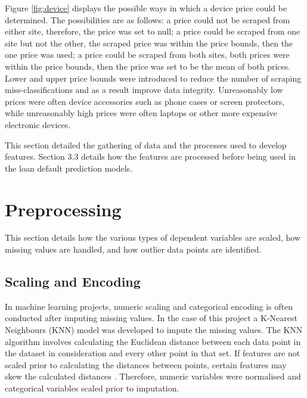 \vspace{10pt}

Figure \ref{fig:device} displays the possible ways in which a device price could be determined. The possibilities are as follows: a price could not be scraped from either site, therefore, the price was set to null; a price could be scraped from one site but not the other, the scraped price was within the price bounds, then the one price was used; a price could be scraped from both sites, both prices were within the price bounds, then the price was set to be the mean of both prices. Lower and upper price bounds were introduced to reduce the number of scraping miss-classifications and as a result improve data integrity. Unreasonably low prices were often device accessories such as phone cases or screen protectors, while unreasonably high prices were often laptops or other more expensive electronic devices.

This section detailed the gathering of data and the processes used to develop features. Section 3.3 details how the features are processed before being used in the loan default prediction models. 


\section{Preprocessing}

This section details how the various types of dependent variables are scaled, how missing values are handled, and how outlier data points are identified. 

\subsection{Scaling and Encoding}

In machine learning projects, numeric scaling and categorical encoding is often conducted after imputing missing values. In the case of this project a K-Nearest Neighbours (KNN) model was developed to impute the missing values. The KNN algorithm involves calculating the Euclidean distance between each data point in the dataset in consideration and every other point in that set. If features are not scaled prior to calculating the distances between points, certain features may skew the calculated distances \parencite{KNNScaling}. Therefore, numeric variables were normalised and categorical variables scaled prior to imputation. 

